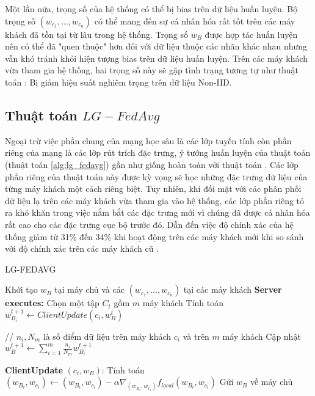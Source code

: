 Một lần nữa, trọng số của hệ thống có thể bị bias trên dữ liệu huấn luyện. Bộ trọng số $(w_{c_1},...,w_{c_n})$ có thể mang đến sự cá nhân hóa rất tốt trên các máy khách đã tồn tại từ lâu trong hệ thống. Trọng số $w_B$ được hợp tác huấn luyện nên có thể đã "quen thuộc" hơn đối với dữ liệu thuộc các nhãn khác nhau nhưng vẫn khó tránh khỏi hiện tượng bias trên dữ liệu huấn luyện. Trên các máy khách vừa tham gia hệ thống, hai trọng số này sẽ gặp tình trạng tương tự như thuật toán : Bị giảm hiệu suất nghiêm trọng trên dữ liệu Non-IID.

\subsection{Thuật toán $LG-FedAvg$}

Ngoại trừ việc phần chung của mạng học sâu là các lớp tuyến tính còn phần riêng của mạng là các lớp rút trích đặc trưng, ý tưởng huấn luyện của thuật toán  (thuật toán \ref{alg:lg_fedavg}) gần như giống hoàn toàn với thuật toán . Các lớp phần riêng của thuật toán này được kỳ vọng sẽ học những đặc trưng dữ liệu của từng máy khách một cách riêng biệt. Tuy nhiên, khi đối mặt với các phân phối dữ liệu lạ trên các máy khách vừa tham gia vào hệ thống, các lớp phần riêng tỏ ra khó khăn trong việc nắm bắt các đặc trưng mới vì chúng đã được cá nhân hóa rất cao cho các đặc trưng cục bộ trước đó. Dẫn đến việc độ chính xác của hệ thống giảm từ 31\% đến 34\% khi hoạt động trên các máy khách mới khi so sánh với độ chính xác trên các máy khách cũ \cite{liang2020think}.

\begin{algorithm}[H]
    \caption{LG-FEDAVG \cite{liang2020think}}\label{alg:lg_fedavg}
    \begin{algorithmic}[1]
        \Require Khởi tạo $w_B$ tại máy chủ và các $(w_{c_1},..., w_{c_n})$ tại các máy khách
        \State \textbf{Server executes:}
            \State Chọn một tập $C_t$ gồm $m$ máy khách
                \State Tính toán $w_{B_i}^{t+1} \gets ClientUpdate(c_i,w_B^{t})$
            \EndFor

            \State // $n_i, N_m$ là số điểm dữ liệu trên máy khách $c_i$ và trên $m$ máy khách
            \State Cập nhật $w_B^{t+1} \gets \sum_{i=1}^m\frac{n_i}{N_m} w_{B_i}^{t+1}$ %
        \EndFor

        \State

        \State \textbf{ClientUpdate} $(c_i, w_B)$: %
        \State Tính toán $(w_{B_i}, w_{c_i}) \gets (w_{B_i}, w_{c_i}) - \alpha\nabla_{(w_{B_i}, w_{c_i})} f_{local}(w_{B_i}, w_{c_i})$
        \State Gửi $w_B$ về máy chủ
    \end{algorithmic}
\end{algorithm}


